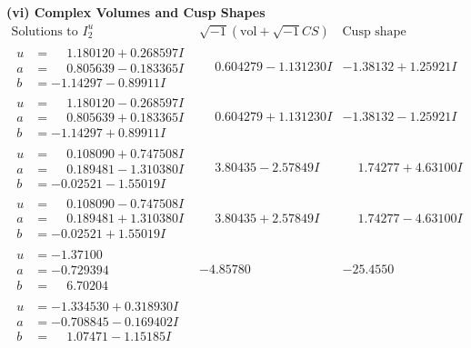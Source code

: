 \documentclass[1p]{elsarticle_modified}
\theoremstyle{definition}
\newcommand{\I}{\sqrt{-1}}
\begin{document}
\newpage\flushleft \textbf{(vi) Complex Volumes and Cusp Shapes}
$$\begin{array}{c|c|c}  
\text{Solutions to }I^u_{2}& \I (\text{vol} + \sqrt{-1}CS) & \text{Cusp shape}\\
 \hline 
\begin{aligned}
u &= \phantom{-}1.180120 + 0.268597 I \\
a &= \phantom{-}0.805639 - 0.183365 I \\
b &= -1.14297 - 0.89911 I\end{aligned}
 & \phantom{-}0.604279 - 1.131230 I & -1.38132 + 1.25921 I \\ \hline\begin{aligned}
u &= \phantom{-}1.180120 - 0.268597 I \\
a &= \phantom{-}0.805639 + 0.183365 I \\
b &= -1.14297 + 0.89911 I\end{aligned}
 & \phantom{-}0.604279 + 1.131230 I & -1.38132 - 1.25921 I \\ \hline\begin{aligned}
u &= \phantom{-}0.108090 + 0.747508 I \\
a &= \phantom{-}0.189481 - 1.310380 I \\
b &= -0.02521 - 1.55019 I\end{aligned}
 & \phantom{-}3.80435 - 2.57849 I & \phantom{-}1.74277 + 4.63100 I \\ \hline\begin{aligned}
u &= \phantom{-}0.108090 - 0.747508 I \\
a &= \phantom{-}0.189481 + 1.310380 I \\
b &= -0.02521 + 1.55019 I\end{aligned}
 & \phantom{-}3.80435 + 2.57849 I & \phantom{-}1.74277 - 4.63100 I \\ \hline\begin{aligned}
u &= -1.37100\phantom{ +0.000000I} \\
a &= -0.729394\phantom{ +0.000000I} \\
b &= \phantom{-}6.70204\phantom{ +0.000000I}\end{aligned}
 & -4.85780\phantom{ +0.000000I} & -25.4550\phantom{ +0.000000I} \\ \hline\begin{aligned}
u &= -1.334530 + 0.318930 I \\
a &= -0.708845 - 0.169402 I \\
b &= \phantom{-}1.07471 - 1.15185 I\end{aligned}

\end{array}$$
\end{document}
